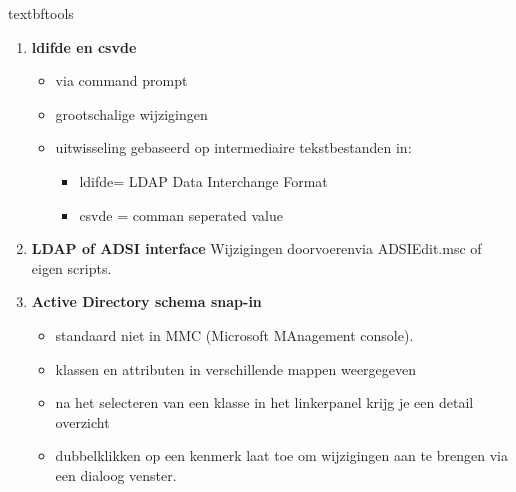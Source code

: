 textbf{tools}
\begin{enumerate}

\item \textbf{ldifde en csvde}
\begin{itemize}
\item via command prompt
\item grootschalige wijzigingen
\item uitwisseling gebaseerd op intermediaire tekstbestanden in:
\begin{itemize}
\item ldifde= LDAP Data Interchange Format
\item csvde = comman seperated value
\end{itemize}
\end{itemize}


\item \textbf{LDAP of ADSI interface} Wijzigingen doorvoerenvia ADSIEdit.msc of eigen scripts.

\item \textbf{Active Directory schema snap-in}
\begin{itemize}
\item standaard niet in MMC (Microsoft MAnagement console).
\item klassen en attributen in verschillende mappen weergegeven
\item na het selecteren van een klasse in het linkerpanel krijg je een detail overzicht
\item dubbelklikken op een kenmerk laat toe om wijzigingen aan te brengen via een dialoog venster.
\end{itemize}


\end{enumerate}














